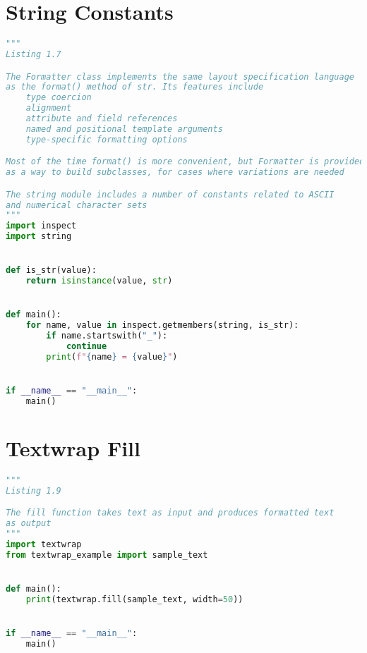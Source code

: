 \documentclass[a4paper,landscape]{report}
\begin{document}
\section{String Constants}
\begin{lstlisting}[language=Python]
"""
Listing 1.7

The Formatter class implements the same layout specification language
as the format() method of str. Its features include
    type coercion
    alignment
    attribute and field references
    named and positional template arguments
    type-specific formatting options

Most of the time format() is more convenient, but Formatter is provided
as a way to build subclasses, for cases where variations are needed

The string module includes a number of constants related to ASCII
and numerical character sets
"""
import inspect
import string


def is_str(value):
    return isinstance(value, str)


def main():
    for name, value in inspect.getmembers(string, is_str):
        if name.startswith("_"):
            continue
        print(f"{name} = {value}")


if __name__ == "__main__":
    main()

\end{lstlisting}
\section{Textwrap Fill}
\begin{lstlisting}[language=Python]
"""
Listing 1.9

The fill function takes text as input and produces formatted text
as output
"""
import textwrap
from textwrap_example import sample_text


def main():
    print(textwrap.fill(sample_text, width=50))


if __name__ == "__main__":
    main()

\end{lstlisting}
\end{document}
